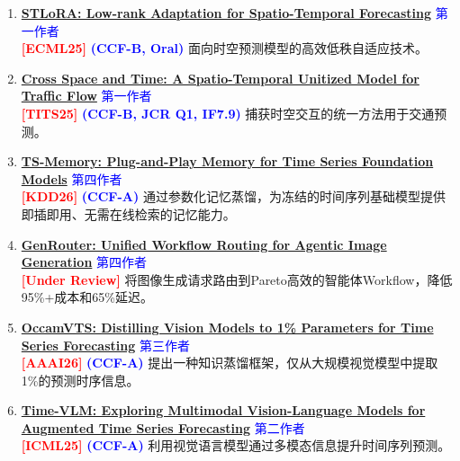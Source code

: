 \begin{enumerate}
\item \textbf{\href{https://arxiv.org/abs/2404.07919}{STLoRA: Low-rank Adaptation for Spatio-Temporal Forecasting}} \hfill \textcolor{blue}{第一作者} \\
\textbf{\textcolor{red}{[ECML25]}}
\textbf{\textcolor{blue}{(CCF-B, Oral)}}
面向时空预测模型的高效低秩自适应技术。

\item \textbf{\href{https://ieeexplore.ieee.org/abstract/document/11173261/}{Cross Space and Time: A Spatio-Temporal Unitized Model for Traffic Flow}} \hfill \textcolor{blue}{第一作者} \\
\textbf{\textcolor{red}{[TITS25]}}
\textbf{\textcolor{blue}{(CCF-B, JCR Q1, IF7.9)}}
捕获时空交互的统一方法用于交通预测。

\item \textbf{\href{https://arxiv.org/abs/2602.11550}{TS-Memory: Plug-and-Play Memory for Time Series Foundation Models}}
\hfill \textcolor{blue}{第四作者} \\
\textbf{\textcolor{red}{[KDD26]}}
\textbf{\textcolor{blue}{(CCF-A)}}
通过参数化记忆蒸馏，为冻结的时间序列基础模型提供即插即用、无需在线检索的记忆能力。

\item \textbf{\href{https://arxiv.org/abs/2608.16721}{GenRouter: Unified Workflow Routing for Agentic Image Generation}}
\hfill \textcolor{blue}{第四作者} \\
\textbf{\textcolor{red}{[Under Review]}}
将图像生成请求路由到Pareto高效的智能体Workflow，降低95\%+成本和65\%延迟。

\item \textbf{\href{https://arxiv.org/abs/2508.01727}{OccamVTS: Distilling Vision Models to 1\% Parameters for Time Series Forecasting}}
\hfill \textcolor{blue}{第三作者} \\
\textbf{\textcolor{red}{[AAAI26]}} 
\textbf{\textcolor{blue}{(CCF-A)}}
提出一种知识蒸馏框架，仅从大规模视觉模型中提取1\%的预测时序信息。

\item \textbf{\href{https://proceedings.mlr.press/v267/zhong25a.html}{Time-VLM: Exploring Multimodal Vision-Language Models for Augmented Time Series Forecasting}} \hfill \textcolor{blue}{第二作者} \\
\textbf{\textcolor{red}{[ICML25]}} 
\textbf{\textcolor{blue}{(CCF-A)}}
利用视觉语言模型通过多模态信息提升时间序列预测。


\end{enumerate}
